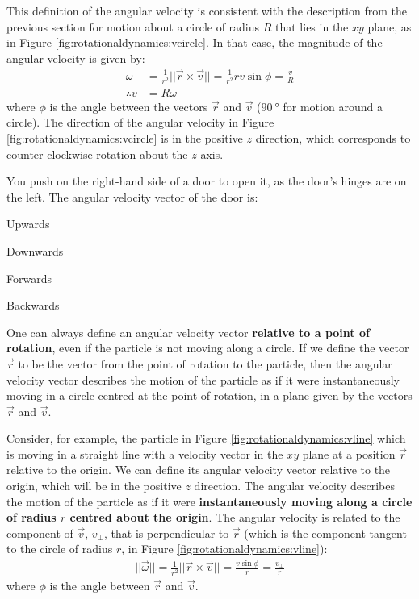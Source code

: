 This definition of the angular velocity is consistent with the description from the previous section for motion about a circle of radius $R$ that lies in the $xy$ plane, as in Figure \ref{fig:rotationaldynamics:vcircle}. In that case, the magnitude of the angular velocity is given by:
\begin{align*}
\omega &=\frac{1}{r^2} || \vec r \times \vec v||= \frac{1}{r^2}r v\sin\phi= \frac{v}{R}\\
\therefore v &= R\omega
\end{align*}
where $\phi$ is the angle between the vectors $\vec r$ and $\vec v$ ($\SI{90}{\degree}$ for motion around a circle). The direction of the angular velocity in Figure \ref{fig:rotationaldynamics:vcircle} is in the positive $z$ direction, which corresponds to counter-clockwise rotation about the $z$ axis. 

\begin{checkpoint}
\begin{MCquestion}{You push on the right-hand side of a door to open it, as the door's hinges are on the left. The angular velocity vector of the door is:}
\item Upwards \correct
\item Downwards
\item Forwards
\item Backwards
\end{MCquestion}
\end{checkpoint}

One can always define an angular velocity vector \textbf{relative to a point of rotation}, even if the particle is not moving along a circle. If we define the vector $\vec r$ to be the vector from the point of rotation to the particle, then the angular velocity vector describes the motion of the particle as if it were instantaneously moving in a circle centred at the point of rotation, in a plane given by the vectors $\vec r$ and $\vec v$. 

Consider, for example, the particle in Figure \ref{fig:rotationaldynamics:vline} which is moving in a straight line with a velocity vector in the $xy$ plane at a position $\vec r$ relative to the origin. We can define its angular velocity vector relative to the origin, which will be in the positive $z$ direction. 
The angular velocity describes the motion of the particle as if it were \textbf{instantaneously moving along a circle of radius $r$ centred about the origin}. The angular velocity is related to the component of $\vec v$, $v_\perp$, that is perpendicular to $\vec r$ (which is the component tangent to the circle of radius $r$, in Figure \ref{fig:rotationaldynamics:vline}):
\begin{align}
||\vec \omega|| = \frac{1}{r^2} || \vec r \times \vec v||=\frac{v\sin\phi}{r}= \frac{v_\perp}{r}
\end{align}
where $\phi$ is the angle between $\vec r$ and $\vec v$.

